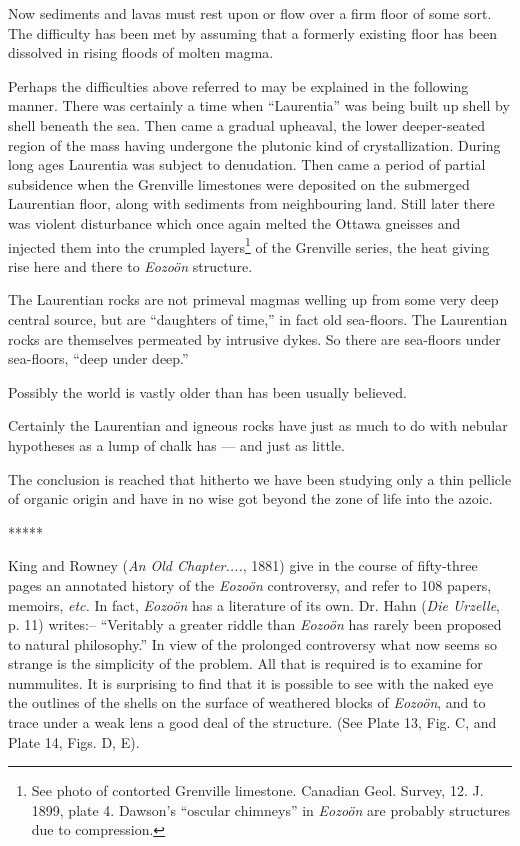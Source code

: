 \documentclass[a4paper, 12pt, oneside]{article}
\begin{document}
Now sediments and lavas must rest upon or flow over a firm floor of some sort. The difficulty has been met by assuming that a formerly existing floor has been dissolved in rising floods of molten magma.

Perhaps the difficulties above referred to may be explained in the following manner. There was certainly a time when ``Laurentia'' was being built up shell by shell beneath the sea. Then came a gradual upheaval, the lower deeper-seated region of the mass having undergone the plutonic kind of crystallization. During long ages Laurentia was subject to denudation. Then came a period of partial subsidence when the Grenville limestones were deposited on the submerged Laurentian floor, along with sediments from neighbouring land. Still later there was violent disturbance which once again melted the Ottawa gneisses and injected them into the crumpled layers\footnote{See photo of contorted Grenville limestone. Canadian Geol. Survey, 12. J. 1899, plate 4. Dawson's ``oscular chimneys'' in \emph{Eozoön} are probably structures due to compression.} of the Grenville series, the heat giving rise here and there to \emph{Eozoön} structure.

The Laurentian rocks are not primeval magmas welling up from some very deep central source, but are ``daughters of time,'' in fact old sea-floors. The Laurentian rocks are themselves permeated by intrusive dykes. So there are sea-floors under sea-floors, ``deep under deep.''

Possibly the world is vastly older than has been usually believed.

Certainly the Laurentian and igneous rocks have just as much to do with nebular hypotheses as a lump of chalk has --- and just as little.

The conclusion is reached that hitherto we have been studying only a thin pellicle of organic origin and have in no wise got beyond the zone of life into the azoic.

\centerline{*\hspace{15mm}*\hspace{15mm}*\hspace{15mm}*\hspace{15mm}*}
\bigskip

King and Rowney (\emph{An Old Chapter....}, 1881) give in the course of fifty-three pages an annotated history of the \emph{Eozoön} controversy, and refer to 108 papers, memoirs, \emph{etc.} In fact, \emph{Eozoön} has a literature of its own. Dr. Hahn (\emph{Die Urzelle}, p. 11) writes:-- ``Veritably a greater riddle than \emph{Eozoön} has rarely been proposed to natural philosophy.'' In view of the prolonged controversy what now seems so strange is the simplicity of the problem. All that is required is to examine for nummulites. It is surprising to find that it is possible to see with the naked eye the outlines of the shells on the surface of weathered blocks of \emph{Eozoön}, and to trace under a weak lens a good deal of the structure. (See Plate 13, Fig. C, and Plate 14, Figs. D, E).
\end{document}
